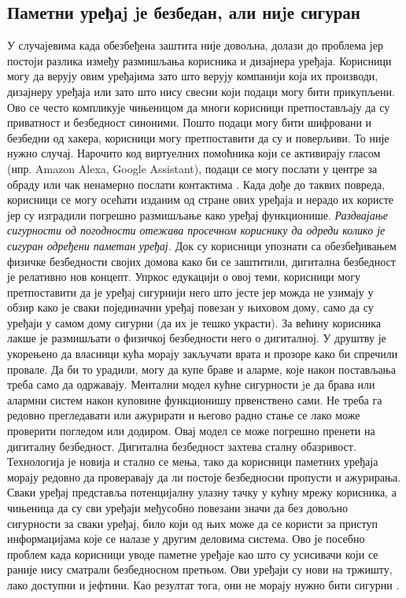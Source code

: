 \documentclass[a4paper]{article}
\begin{document}
\subsection{Паметни уређаj jе безбедан, али ниjе сигуран}
У случајевима када обезбеђена заштита није довољна, долази до проблема јер постоји разлика између размишљања корисника и
дизајнера уређаја. Корисници могу да верују овим уређајима зато што верују компанији која их производи, дизајнеру уређаја или зато
што нису свесни који подаци могу бити прикупљени. Ово се често компликује чињеницом да многи корисници претпостављају да су приватност и
безбедност синоними. Пошто подаци могу бити шифровани и безбедни од хакера, корисници могу претпоставити да су и поверљиви. То није нужно случај.
Нарочито код виртуелних помоћника који се активирају гласом (нпр. Amazon Alexa, Google Assistant), подаци се могу послати у центре за обраду или
чак ненамерно послати контактима \cite{1} \cite{2}. Када дође до таквих повреда, корисници се могу осећати изданим од стране ових уређаја и нерадо их
користе јер су изградили погрешно размишљање како уређај функционише.
\newline \newline
\emph{Раздвајање сигурности од погодности отежава просечном кориснику да одреди колико је сигуран одређени паметан уређај.}
\newline  \newline
Док су корисници упознати са обезбеђивањем физичке безбедности својих домова како би се заштитили, дигитална безбедност је релативно
нов концепт. Упркос едукацији о овој теми, корисници могу претпоставити да је уређај сигурнији него што јесте јер можда не узимају
у обзир како је сваки појединачни уређај повезан у њиховом дому, само да су уређаји у самом дому сигурни (да их је тешко украсти).
\newline  \newline
За већину корисника лакше је размишљати о физичкој безбедности него о дигиталној. У друштву је укорењено да власници кућа морају закључати
врата и прозоре како би спречили провале. Да би то урадили, могу да купе браве и аларме, које након постављања треба само да одржавају.
Ментални модел кућне сигурности jе да брава или алармни систем након куповине функционишу првенствено сами. Не треба га редовно
прегледавати или ажурирати и његово радно стање се лако може проверити погледом или додиром. Овај модел се може погрешно пренети на дигиталну безбедност.
\newline  \newline
Дигитална безбедност захтева сталну обазривост. Технологија је новија и стално се мења, тако да корисници паметних уређаја морају редовно да
проверавају да ли постоје безбедносни пропусти и ажурирања. Сваки уређај представља потенцијалну улазну тачку у кућну мрежу корисника, а
чињеница да су сви уређаји међусобно повезани значи да без довољно сигурности за сваки уређај, било који од њих може да се користи за приступ
информацијама које се налазе у другим деловима система. Ово је посебно проблем када корисници уводе паметне уређаје као што су усисивачи који се
раније нису сматрали безбедносном претњом. Ови уређаји су нови на тржишту, лако доступни и јефтини. Као резултат тога, они не морају нужно бити сигурни \cite{3}.
\end{document}
